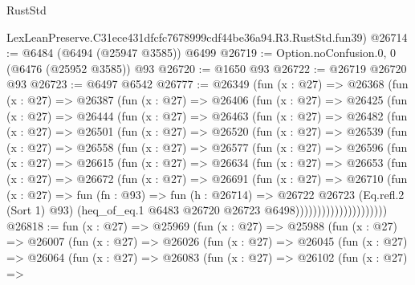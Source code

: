 \begin{lexlean}{RustStd}
\begin{coremodule}
    LexLeanPreserve.C31ece431dfcfc7678999cdf44be36a94.R3.RustStd.fun39)
@26714 := @6484 (@6494 (@25947 @3585)) @6499
@26719 := Option.noConfusion.{0, 0} (@6476 (@25952 @3585)) @93
@26720 := @1650 @93
@26722 := @26719 @26720 @93
@26723 := @6497 @6542
@26777 := @26349
    (fun (x : @27) =>
    @26368
      (fun (x : @27) =>
      @26387
        (fun (x : @27) =>
        @26406
          (fun (x : @27) =>
          @26425
            (fun (x : @27) =>
            @26444
              (fun (x : @27) =>
              @26463
                (fun (x : @27) =>
                @26482
                  (fun (x : @27) =>
                  @26501
                    (fun (x : @27) =>
                    @26520
                      (fun (x : @27) =>
                      @26539
                        (fun (x : @27) =>
                        @26558
                          (fun (x : @27) =>
                          @26577
                            (fun (x : @27) =>
                            @26596
                              (fun (x : @27) =>
                              @26615
                                (fun (x : @27) =>
                                @26634
                                  (fun (x : @27) =>
                                  @26653
                                    (fun (x : @27) =>
                                    @26672
                                      (fun (x : @27) =>
                                      @26691
                                        (fun (x : @27) =>
                                        @26710
                                          (fun (x : @27) =>
                                          fun (fn : @93) =>
                                          fun (h : @26714) =>
                                          @26722
                                            @26723
                                            (Eq.refl.{2} (Sort 1) @93)
                                            (heq_of_eq.{1}
                                              @6483
                                              @26720
                                              @26723
                                              @6498)))))))))))))))))))))
@26818 := fun (x : @27) =>
  @25969
    (fun (x : @27) =>
    @25988
      (fun (x : @27) =>
      @26007
        (fun (x : @27) =>
        @26026
          (fun (x : @27) =>
          @26045
            (fun (x : @27) =>
            @26064
              (fun (x : @27) =>
              @26083
                (fun (x : @27) =>
                @26102
                  (fun (x : @27) =>

\end{coremodule}
\end{lexlean}
